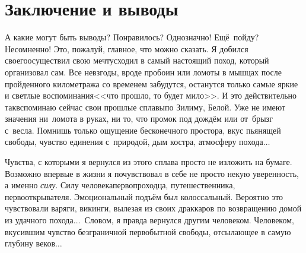 \chapter{Заключение и выводы}
\vepsianrose

А какие могут быть выводы? Понравилось? Однозначно! Ещё~пойду? Несомненно! Это, пожалуй, главное, что можно сказать. Я добился своего\mdash осуществил свою мечту\mdash сходил в самый настоящий поход, который организовал сам. Все невзгоды, вроде пробоин или ломоты в мышцах после пройденного километража со временем забудутся, останутся только самые яркие и светлые воспоминания\mdash <<что прошло, то будет мило>>. И это действительно так\mdash вспоминаю сейчас свои прошлые сплавы\mdash по Зилиму, Белой. Уже не имеют значения ни~ломота в руках, ни то, что промок под дождём или от~брызг с~весла. Помнишь только ощущение бесконечного простора, вкус пьянящей свободы, чувство единения с~природой, дым костра, атмосферу похода$\ldots$ 

Чувства, с которыми я вернулся из этого сплава просто не изложить на бумаге. Возможно впервые в жизни я почувствовал в себе не просто некую уверенность, а именно \textit{силу}. Силу человека\sdash первопроходца, путешественника, первооткрывателя. Эмоциональный подъём был колоссальный. Вероятно это чувствовали варяги, викинги, вылезая из своих драккаров по возвращению домой из удачного похода$\ldots$~Словом, я правда вернулся другим человеком. Человеком, вкусившим чувство безграничной первобытной свободы, отсылающее в самую глубину веков$\ldots$

